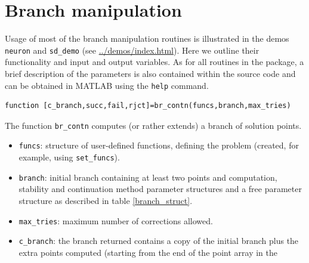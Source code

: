 \documentclass[10pt]{scrartcl}
\newcommand{\demobase}{\url{../demos/index.html}}
\newcommand{\blist}[1]{\mbox{\lstinline!#1!}}
\begin{document}
{\section{Branch manipulation}\label{branch_manipulation}

Usage of most of the branch manipulation routines is illustrated in
the demos \texttt{neuron} and \texttt{sd\_demo} (see
\demobase{}).  Here we outline their functionality and
input and output variables.  As for all routines in the package, a
brief description of the parameters is also contained within the
source code and can be obtained in MATLAB using the \blist{help}
command.
\begin{lstlisting}
function [c_branch,succ,fail,rjct]=br_contn(funcs,branch,max_tries)  
\end{lstlisting}
\noindent The function \blist{br_contn} computes (or rather 
extends) a branch of solution
points. 
\begin{itemize}
\item \blist{funcs}: structure of user-defined functions, defining the
  problem (created, for example, using \blist{set_funcs}).
\item \blist{branch}: initial branch 
containing at least two points and computation, stability and 
continuation method parameter
structures and a free parameter structure as described in 
table \ref{branch_struct}. 
\item \blist{max_tries}:
maximum number of corrections allowed.
\item \blist{c_branch}:
the branch returned contains a copy of the initial branch plus
the extra points computed (starting from the end of the point array in the

\end{itemize}}
\end{document}
